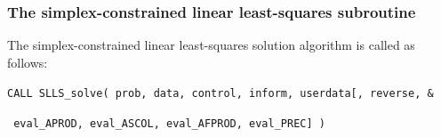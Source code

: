 \documentclass{galahad}
\newcommand{\packagename}{SLLS}
\begin{document}
\subsubsection{The simplex-constrained linear least-squares subroutine}\label{qps}
The simplex-constrained linear least-squares solution algorithm is called
as follows:
\vspace*{1mm}

\hspace{8mm}
{\tt CALL \packagename\_solve( prob, data, control, inform, userdata[,
reverse, \&}
\vspace*{-1mm}

\hspace{37mm}
{\tt
 eval\_APROD, eval\_ASCOL, eval\_AFPROD, eval\_PREC] )}

\vspace*{-3mm}
\end{document}
